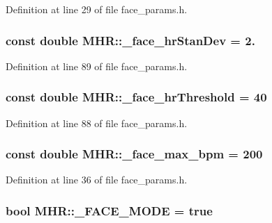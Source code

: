 Definition at line 29 of file face\+\_\+params.\+h.

\hypertarget{namespace_m_h_r_a0eb61186bc00ecb180d50821bee1d360}{
\subsubsection[{\+\_\+face\+\_\+hr\+Stan\+Dev}]{\setlength{\rightskip}{0pt plus 5cm}const double M\+H\+R\+::\+\_\+face\+\_\+hr\+Stan\+Dev = 2.}}\label{namespace_m_h_r_a0eb61186bc00ecb180d50821bee1d360}


Definition at line 89 of file face\+\_\+params.\+h.

\hypertarget{namespace_m_h_r_a1e8025b0c611a1a8b4bf74baca52c91c}{
\subsubsection[{\+\_\+face\+\_\+hr\+Threshold}]{\setlength{\rightskip}{0pt plus 5cm}const double M\+H\+R\+::\+\_\+face\+\_\+hr\+Threshold = 40}}\label{namespace_m_h_r_a1e8025b0c611a1a8b4bf74baca52c91c}


Definition at line 88 of file face\+\_\+params.\+h.

\hypertarget{namespace_m_h_r_a123d7bba4eba9d4c49ebe21458394a9a}{
\subsubsection[{\+\_\+face\+\_\+max\+\_\+bpm}]{\setlength{\rightskip}{0pt plus 5cm}const double M\+H\+R\+::\+\_\+face\+\_\+max\+\_\+bpm = 200}}\label{namespace_m_h_r_a123d7bba4eba9d4c49ebe21458394a9a}


Definition at line 36 of file face\+\_\+params.\+h.

\hypertarget{namespace_m_h_r_a364268cdc7b75db63f89c9d8960aa1b4}{
\subsubsection[{\+\_\+\+F\+A\+C\+E\+\_\+\+M\+O\+D\+E}]{\setlength{\rightskip}{0pt plus 5cm}bool M\+H\+R\+::\+\_\+\+F\+A\+C\+E\+\_\+\+M\+O\+D\+E = true}}\label{namespace_m_h_r_a364268cdc7b75db63f89c9d8960aa1b4}


